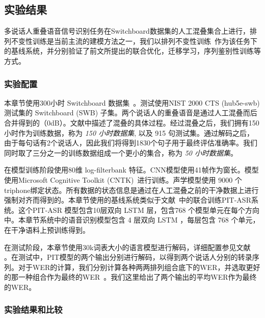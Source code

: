 \subsection{实验结果} %
\label{Sec:exp-pit}

多说话人重叠语音信号识别任务在Switchboard数据集的人工混叠集合上进行，排列不变性训练是当前主流的建模方法之一，我们以排列不变性训练~\cite{yu2017recognizing}作为该任务下的基线系统，并分别验证了前文所提出的联合优化，迁移学习，序列鉴别性训练等方式。

\subsubsection{实验配置}
\label{Sec:exp-pit-setup}

本章节使用300小时 Switchboard 数据集~\cite{godfrey1992switchboard}。测试使用NIST
2000 CTS (hub5e-swb) 测试集的 Switchboard (SWB) 子集。两个说话人的重叠语音是通过人工混叠而后合并得到的（0dB）。文献\cite{chen2018progressive}中描述了混叠的具体过程。经过混叠之后，我们拥有150小时作为训练数据，称为 {\em{150 小时数据集}}, 以及 915 句测试集。通过解码之后，由于每句话有2个说话人，因此我们将得到1830个句子用于最终评估准确率。我们同时取了三分之一的训练数据组成一个更小的集合，称为 {\em{50 小时数据集}}。

在模型训练阶段使用80维 log-filterbank 特征。CNN模型使用41帧作为窗长。模型使用Microsoft Cognitive Toolkit (CNTK)~\cite{seide2016cntk}进行训练。声学模型使用 9000 个triphone绑定状态。所有数据的状态信息是通过在人工混叠之前的干净数据上进行强制对齐而得到的。本章节使用的基线系统类似于文献~\cite{yu2017recognizing}中的联合训练PIT-ASR系统。这个PIT-ASR 模型包含10层双向 LSTM 层，包含768 个模型单元在每个方向中。本章节系统中的语音识别模型包含 4 层双向 LSTM ，每层包含 768 个单元，在干净语料上预训练得到。

在测试阶段，本章节使用30k词表大小的语言模型进行解码，详细配置参见文献~\cite{chen2018progressive} 。在测试中，PIT模型的两个输出分别进行解码，以得到两个说话人分别的转录序列。对于WER的计算，我们分别计算各种两两排列组合底下的WER，并选取更好的那一种组合作为最终的WER~\cite{yu2017recognizing}。我们这里给出了两个输出的平均WER作为最终的WER。

\subsubsection{实验结果和比较}
\label{Sec:exp-pit-result}

